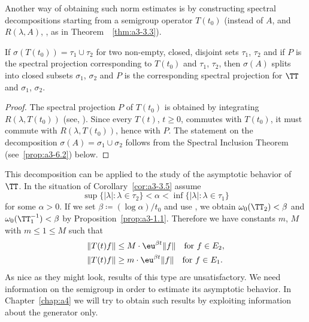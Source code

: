 Another way of obtaining such norm estimates is by constructing spectral decompositions starting from a semigroup operator $T(t_{0})$ (instead of\/ $A$, and $R(\lambda,A)$, \resp, as in Theorem~~\ref{thm:a3-3.3}).
\begin{corollary}\label{cor:a3-3.5}
If\/ $\sigma(T(t_{0})) = \tau_{1} \cup \tau_{2}$ for two non-empty, closed, disjoint sets $\tau_{1}$, $\tau_{2}$ and if\/ $P$ is the spectral projection corresponding to $T(t_{0})$ and $\tau_{1}$, $\tau_{2}$, then $\sigma(A)$ splits into closed subsets $\sigma_{1}$, $\sigma_{2}$ and $P$ is the corresponding spectral projection for $\TT$ and $\sigma_{1}$, $\sigma_{2}$.
\end{corollary}
\begin{proof}
The spectral projection $P$ of\/ $T(t_{0})$ is obtained by integrating $R(\lambda,T(t_{0}))$ (see, \eg \textcite[Section VII.3]{dunfordschwartz:1958}).
Since every $T(t)$, $t \geq 0$, commutes with $T(t_{0})$, it must commute with $R(\lambda,T(t_{0}))$, hence with $P$.
The statement on the decomposition $\sigma(A) = \sigma_{1} \cup \sigma_{2}$ follows from the Spectral Inclusion Theorem (see~\ref{prop:a3-6.2}) below.
\end{proof}
This decomposition can be applied to the study of the asymptotic behavior of\/ $\TT$. In the situation of Corollary~\ref{cor:a3-3.5} assume
\[
\sup \{|\lambda| \colon \lambda \in \tau_{2}\} < \alpha < \inf \{|\lambda| \colon \lambda \in \tau_{1}\} 
\]
for some $\alpha > 0$. 
If we set $\beta \coloneq (\log\alpha)/t_{0}$ and use 
\textcite[Chap.I, Theorem~6.5]{pazy:1983}, 
we obtain $\omega_{0}(\TT_{2}) < \beta$ and $\omega_{0}(\TT_{1}^{-1}) < \beta$ by Proposition~\ref{prop:a3-1.1}.
Therefore we have constants $m$, $M$ with $m  \leq 1  \leq M $ such that
\begin{align*}
	\|T(t)f\| &\leq M \cdot \eu^{\beta t}\|f\| \quad \text{for } f \in E_{2} , \\
	\|T(t)f\| &\geq m \cdot \eu^{\beta t}\|f\| \quad \text{for } f \in E_{1} .
\end{align*}
As nice as they might look, results of this type are unsatisfactory. We need information on the semigroup in order to estimate its asymptotic behavior.
In Chapter~\ref{chap:a4} we will try to obtain such results by exploiting information about the generator only.
